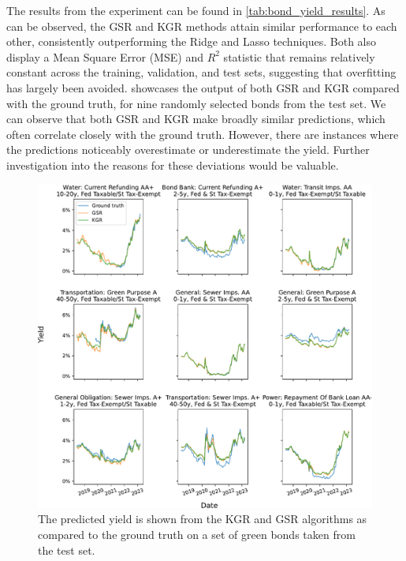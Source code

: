 The results from the experiment can be found in \cref{tab:bond_yield_results}. As can be observed, the GSR and KGR methods attain similar performance to each other, consistently outperforming the Ridge and Lasso techniques. Both also display a Mean Square Error (MSE) and $R^2$ statistic that remains relatively constant across the training, validation, and test sets, suggesting that overfitting has largely been avoided.  showcases the output of both GSR and KGR compared with the ground truth, for nine randomly selected bonds from the test set. We can observe that both GSR and KGR make broadly similar predictions, which often correlate closely with the ground truth. However, there are instances where the predictions noticeably overestimate or underestimate the yield. Further investigation into the reasons for these deviations would be valuable.

\begin{figure}[t]  
    \begin{center}
        \includegraphics[width=\linewidth]{Figures/bond_yield_predictions.pdf}
    \end{center}
   \caption[The output of the KGR and GSR algorithms on several green bonds from the test set]{The predicted yield is shown from the KGR and GSR algorithms as compared to the ground truth on a set of green bonds taken from the test set. } 
    \label{fig:bond_yield_predictions}
\end{figure} 



